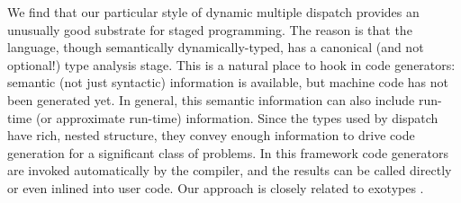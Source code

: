 We find that our particular style of dynamic multiple dispatch provides
an unusually good substrate for staged programming.
The reason is that the language, though semantically dynamically-typed,
has a canonical (and not optional!) type analysis stage.
This is a natural place to hook in code generators: semantic (not just
syntactic) information is available, but machine code has not been
generated yet.
In general, this semantic information can also include run-time (or
approximate run-time) information.
Since the types used by dispatch have rich, nested structure, they
convey enough information to drive code generation for a significant
class of problems.
In this framework code generators are invoked automatically by
the compiler, and the results can be called directly or even inlined
into user code.
Our approach is closely related to exotypes
\cite{DeVito:2014:FRG:2594291.2594307}.









